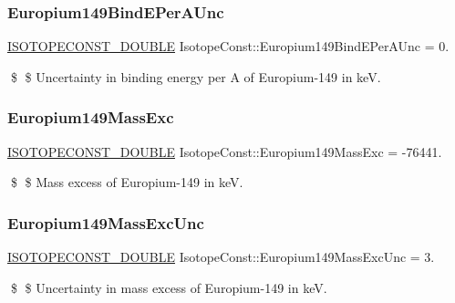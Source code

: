 \subsubsection{\texorpdfstring{Europium149\+Bind\+E\+Per\+A\+Unc}{Europium149BindEPerAUnc}}
{\footnotesize\ttfamily \mbox{\hyperlink{group___isotope_const-_macros_ga8f45a7272ce02c0b4c65c44636ed719a}{I\+S\+O\+T\+O\+P\+E\+C\+O\+N\+S\+T\+\_\+\+D\+O\+U\+B\+LE}} Isotope\+Const\+::\+Europium149\+Bind\+E\+Per\+A\+Unc = 0.}

\$ \$ Uncertainty in binding energy per A of Europium-\/149 in keV. \mbox{\label{group___isotope_const-_europium-_eu149_ga89e289ef2a08e60add945b146dc042a3}} 
\subsubsection{\texorpdfstring{Europium149\+Mass\+Exc}{Europium149MassExc}}
{\footnotesize\ttfamily \mbox{\hyperlink{group___isotope_const-_macros_ga8f45a7272ce02c0b4c65c44636ed719a}{I\+S\+O\+T\+O\+P\+E\+C\+O\+N\+S\+T\+\_\+\+D\+O\+U\+B\+LE}} Isotope\+Const\+::\+Europium149\+Mass\+Exc = -\/76441.}

\$ \$ Mass excess of Europium-\/149 in keV. \mbox{\label{group___isotope_const-_europium-_eu149_gaf37fdfe555460e65941f5710bcb1b33a}} 
\subsubsection{\texorpdfstring{Europium149\+Mass\+Exc\+Unc}{Europium149MassExcUnc}}
{\footnotesize\ttfamily \mbox{\hyperlink{group___isotope_const-_macros_ga8f45a7272ce02c0b4c65c44636ed719a}{I\+S\+O\+T\+O\+P\+E\+C\+O\+N\+S\+T\+\_\+\+D\+O\+U\+B\+LE}} Isotope\+Const\+::\+Europium149\+Mass\+Exc\+Unc = 3.}

\$ \$ Uncertainty in mass excess of Europium-\/149 in keV. \mbox{\label{group___isotope_const-_europium-_eu149_ga45e074cdfb31dc0fc09cca040dfdd267}} 
